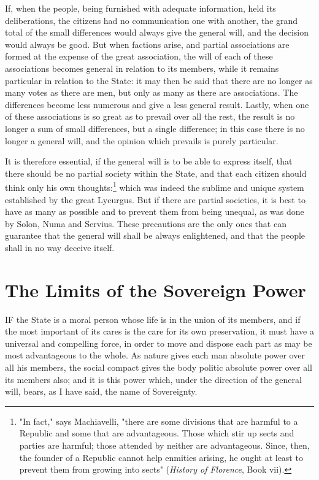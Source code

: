 \documentclass[12pt]{report}
\begin{document}
If, when the people, being furnished with adequate information, held its deliberations, the citizens had no communication one with another, the grand total of the small differences would always give the general will, and the decision would always be good. But when factions arise, and partial associations are formed at the expense of the great association, the will of each of these associations becomes general in relation to its members, while it remains particular in relation to the State: it may then be said that there are no longer as many votes as there are men, but only as many as there are associations. The differences become less numerous and give a less general result. Lastly, when one of these associations is so great as to prevail over all the rest, the result is no longer a sum of small differences, but a single difference; in this case there is no longer a general will, and the opinion which prevails is purely particular.

It is therefore essential, if the general will is to be able to express itself, that there should be no partial society within the State, and that each citizen should think only his own thoughts:\footnote{"In fact," says Machiavelli, "there are some divisions that are harmful to a Republic and some that are advantageous. Those which stir up sects and parties are harmful; those attended by neither are advantageous. Since, then, the founder of a Republic cannot help enmities arising, he ought at least to prevent them from growing into sects" (\textit{History of Florence}, Book vii).} which was indeed the sublime and unique system established by the great Lycurgus. But if there are partial societies, it is best to have as many as possible and to prevent them from being unequal, as was done by Solon, Numa and Servius. These precautions are the only ones that can guarantee that the general will shall be always enlightened, and that the people shall in no way deceive itself.

\section{The Limits of the Sovereign Power}
IF the State is a moral person whose life is in the union of its members, and if the most important of its cares is the care for its own preservation, it must have a universal and compelling force, in order to move and dispose each part as may be most advantageous to the whole. As nature gives each man absolute power over all his members, the social compact gives the body politic absolute power over all its members also; and it is this power which, under the direction of the general will, bears, as I have said, the name of Sovereignty.
\end{document}
